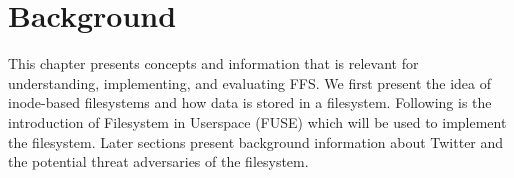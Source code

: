 \chapter{Background}

\label{ch:background}






This chapter presents concepts and information that is relevant for understanding, implementing, and evaluating FFS. We first present the idea of inode-based filesystems and how data is stored in a filesystem. Following is the introduction of Filesystem in Userspace (FUSE) which will be used to implement the filesystem. Later sections present background information about Twitter and the potential threat adversaries of the filesystem. 







